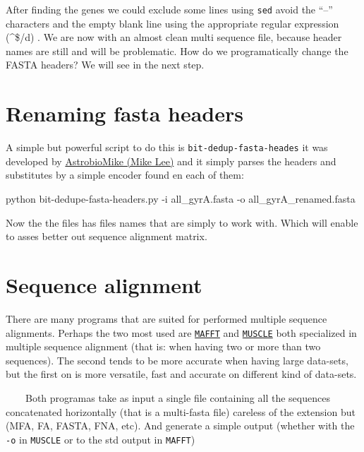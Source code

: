 \documentclass[
  letterpaper,
  DIV=11,
  numbers=noendperiod]{scrreprt}
\newenvironment{Shaded}{\begin{snugshade}}{\end{snugshade}}
\newcommand{\AttributeTok}[1]{\textcolor[rgb]{0.40,0.46,0.14}{#1}}
\newcommand{\ExtensionTok}[1]{\textcolor[rgb]{0.00,0.46,0.62}{#1}}
\newcommand{\NormalTok}[1]{\textcolor[rgb]{0.00,0.46,0.62}{#1}}
\begin{document}
After finding the genes we could exclude some lines using \texttt{sed}
avoid the ``--'' characters and the empty blank line using the
appropriate regular expression (\^{}\$/d) . We are now with an almost
clean multi sequence file, because header names are still and will be
problematic. How do we programatically change the FASTA headers? We will
see in the next step.

\hypertarget{renaming-fasta-headers}{%
\section*{Renaming fasta headers}\label{renaming-fasta-headers}}

A simple but powerful script to do this is
\texttt{bit-dedup-fasta-heades} it was developed by
\href{https://github.com/AstrobioMike}{AstrobioMike (Mike Lee)} and it
simply parses the headers and substitutes by a simple encoder found en
each of them:

\begin{Shaded}
\begin{Highlighting}[]
\ExtensionTok{python}\NormalTok{ bit{-}dedupe{-}fasta{-}headers.py }\AttributeTok{{-}i}\NormalTok{ all\_gyrA.fasta }\AttributeTok{{-}o}\NormalTok{ all\_gyrA\_renamed.fasta}
\end{Highlighting}
\end{Shaded}

Now the the files has files names that are simply to work with. Which
will enable to asses better out sequence alignment matrix.

\hypertarget{sequence-alignment}{%
\section*{Sequence alignment}\label{sequence-alignment}}

There are many programs that are suited for performed multiple sequence
alignments. Perhaps the two most used are
\href{https://mafft.cbrc.jp/alignment/software/}{\texttt{MAFFT}} and
\href{https://drive5.com/muscle5/}{\texttt{MUSCLE}} both specialized in
multiple sequence alignment (that is: when having two or more than two
sequences). The second tends to be more accurate when having large
data-sets, but the first on is more versatile, fast and accurate on
different kind of data-sets.

~~~~Both programas take as input a single file containing all the
sequences concatenated horizontally (that is a multi-fasta file)
careless of the extension but (MFA, FA, FASTA, FNA, etc). And generate a
simple output (whether with the \texttt{-o} in \texttt{MUSCLE} or to the
std output in \texttt{MAFFT}) ~~~~
\end{document}
